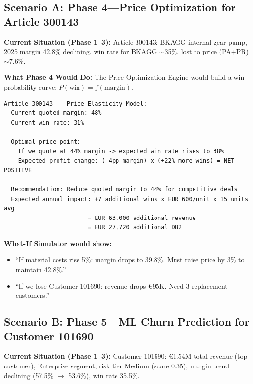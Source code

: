 \documentclass[11pt,a4paper]{article}
\newcommand{\EUR}{\euro{}}
\begin{document}
\subsection{Scenario A: Phase 4---Price Optimization for Article 300143}

\textbf{Current Situation (Phase 1--3):} Article 300143: BKAGG internal gear pump, 2025 margin 42.8\% declining, win rate for BKAGG $\sim$35\%, lost to price (PA+PR) $\sim$7.6\%.

\textbf{What Phase 4 Would Do:} The Price Optimization Engine would build a win probability curve: $P(\text{win}) = f(\text{margin})$.

\begin{lstlisting}
Article 300143 -- Price Elasticity Model:
  Current quoted margin: 48%
  Current win rate: 31%

  Optimal price point:
    If we quote at 44% margin -> expected win rate rises to 38%
    Expected profit change: (-4pp margin) x (+22% more wins) = NET POSITIVE

  Recommendation: Reduce quoted margin to 44% for competitive deals
  Expected annual impact: +7 additional wins x EUR 600/unit x 15 units avg
                        = EUR 63,000 additional revenue
                        = EUR 27,720 additional DB2
\end{lstlisting}

\textbf{What-If Simulator would show:}
\begin{itemize}[nosep]
  \item ``If material costs rise 5\%: margin drops to 39.8\%. Must raise price by 3\% to maintain 42.8\%.''
  \item ``If we lose Customer 101690: revenue drops \EUR95K. Need 3 replacement customers.''
\end{itemize}

\subsection{Scenario B: Phase 5---ML Churn Prediction for Customer 101690}

\textbf{Current Situation (Phase 1--3):} Customer 101690: \EUR1.54M total revenue (top customer), Enterprise segment, risk tier Medium (score 0.35), margin trend declining (57.5\% $\to$ 53.6\%), win rate 35.5\%.
\end{document}
